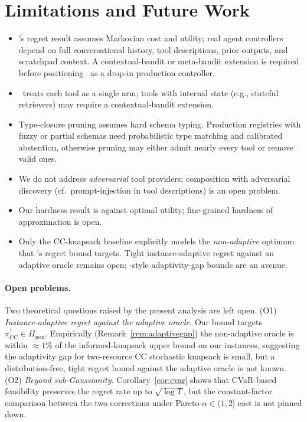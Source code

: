 \section{Limitations and Future Work}
\label{sec:limitations}

\begin{itemize}
  \item \CBSLAO's regret result assumes Markovian cost and utility;
    real agent controllers depend on full conversational history, tool
    descriptions, prior outputs, and scratchpad context. A
    contextual-bandit or meta-bandit extension is required before
    positioning \CBUC~as a drop-in production controller.
  \item \CBUC~treats each tool as a single arm; tools with internal
    state (e.g., stateful retrievers) may require a contextual-bandit
    extension.
  \item Type-closure pruning assumes hard schema typing. Production
    registries with fuzzy or partial schemas need probabilistic type
    matching and calibrated abstention, otherwise pruning may either
    admit nearly every tool or remove valid ones.
  \item We do not address \emph{adversarial} tool providers; composition
    with adversarial discovery (cf.\ prompt-injection in tool
    descriptions) is an open problem.
  \item Our hardness result is against optimal utility; fine-grained
    hardness of approximation is open.
  \item Only the CC-knapsack baseline explicitly models the
    \emph{non-adaptive} optimum that \CBUC's regret bound targets.
    Tight instance-adaptive regret against an adaptive oracle remains
    open; \cite{dean2008stochastic}-style adaptivity-gap bounds are
    an avenue.
\end{itemize}

\paragraph{Open problems.}
Two theoretical questions raised by the present analysis are left
open. (O1) \emph{Instance-adaptive regret against the adaptive oracle.} Our
bound targets $\pi^\dagger_{\mathrm{CC}} \in \Pi_{\mathrm{non}}$.
Empirically (Remark~\ref{rem:adaptivegap}) the non-adaptive
oracle is within $\approx 1\%$ of the informed-knapsack upper bound on
our instances, suggesting the adaptivity gap for two-resource CC
stochastic knapsack is small, but a distribution-free, tight regret
bound against the adaptive oracle is not known. (O2)
\emph{Beyond sub-Gaussianity.} Corollary~\ref{cor:cvar} shows that
CVaR-based feasibility preserves the regret rate up to $\sqrt{\log T}$,
but the constant-factor comparison between the two corrections under
Pareto-$\alpha \in (1, 2]$ cost is not pinned down.
